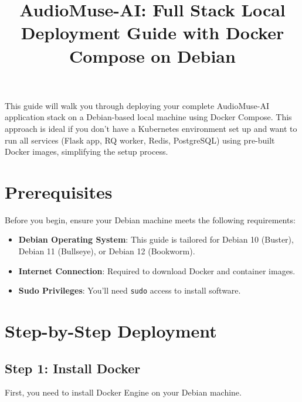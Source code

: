 \documentclass{article}
\title{AudioMuse-AI: Full Stack Local Deployment Guide with Docker Compose on Debian}
\author{}
\date{}
\begin{document}
\maketitle

This guide will walk you through deploying your complete AudioMuse-AI application stack on a Debian-based local machine using Docker Compose. This approach is ideal if you don't have a Kubernetes environment set up and want to run all services (Flask app, RQ worker, Redis, PostgreSQL) using pre-built Docker images, simplifying the setup process.

\section*{Prerequisites}

Before you begin, ensure your Debian machine meets the following requirements:

\begin{itemize}
    \item \textbf{Debian Operating System}: This guide is tailored for Debian 10 (Buster), Debian 11 (Bullseye), or Debian 12 (Bookworm).
    \item \textbf{Internet Connection}: Required to download Docker and container images.
    \item \textbf{Sudo Privileges}: You'll need \texttt{sudo} access to install software.
\end{itemize}

\section*{Step-by-Step Deployment}

\subsection*{Step 1: Install Docker}

First, you need to install Docker Engine on your Debian machine.
\end{document}
